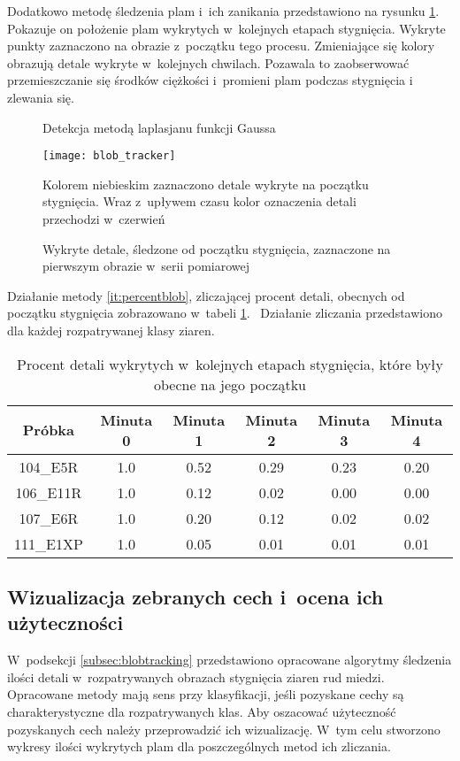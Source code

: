 Dodatkowo metodę śledzenia plam i~ich zanikania przedstawiono na rysunku
\ref{fig:blobremain}.
Pokazuje on położenie plam wykrytych w~kolejnych etapach stygnięcia.
Wykryte punkty zaznaczono na obrazie z~początku tego procesu.
Zmieniające się kolory obrazują detale wykryte w~kolejnych chwilach.
Pozawala to zaobserwować przemieszczanie się środków ciężkości i~promieni
plam podczas stygnięcia i zlewania się.
\begin{figure}[htbp]
    \centering
    \caption*{\scriptsize Detekcja metodą laplasjanu funkcji Gaussa}
    \texttt{[image: blob\_tracker]}
    \vspace{0.3cm}
    \caption*{\scriptsize
        Kolorem niebieskim zaznaczono detale wykryte na początku stygnięcia.
        Wraz z~upływem czasu kolor oznaczenia detali przechodzi w~czerwień}
    \caption{Wykryte detale, śledzone od początku stygnięcia, zaznaczone na
             pierwszym obrazie w~serii pomiarowej}
    \label{fig:blobremain}
\end{figure}
Działanie metody \ref{it:percentblob}, zliczającej procent detali, obecnych
od początku stygnięcia zobrazowano w~tabeli \ref{tab:blobpercent}.~
Działanie zliczania przedstawiono dla każdej rozpatrywanej klasy ziaren.
\begin{table}[htbp]
	\centering
	\begin{tabular}{c|c|c|c|c|c}
	\toprule
	Próbka & Minuta 0 & Minuta 1 & Minuta 2 & Minuta 3 & Minuta 4 \\ \midrule
	104\_E5R  & 1.0 & 0.52 & 0.29 & 0.23 & 0.20 \\
	106\_E11R & 1.0 & 0.12 & 0.02 & 0.00 & 0.00 \\
	107\_E6R  & 1.0 & 0.20 & 0.12 & 0.02 & 0.02 \\
	111\_E1XP & 1.0 & 0.05 & 0.01 & 0.01 & 0.01 \\
	\bottomrule
	\end{tabular}
\caption{Procent detali wykrytych w~kolejnych etapach stygnięcia, które
         były obecne na jego początku}
\label{tab:blobpercent}
\end{table}

\subsection{Wizualizacja zebranych cech i~ocena ich użyteczności}
\label{subsec:datavis}
W~podsekcji \ref{subsec:blobtracking} przedstawiono opracowane algorytmy
śledzenia ilości detali w~rozpatrywanych obrazach stygnięcia ziaren rud
miedzi.
Opracowane metody mają sens przy klasyfikacji, jeśli pozyskane cechy są
charakterystyczne dla rozpatrywanych klas.
Aby oszacować użyteczność pozyskanych cech należy przeprowadzić ich
wizualizację.
W~tym celu stworzono wykresy ilości wykrytych plam dla poszczególnych
metod ich zliczania.

